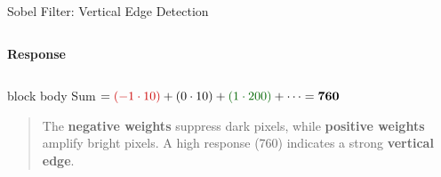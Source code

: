 \documentclass[
11pt,notheorems,hyperref={pdfauthor=whatever}
]{beamer}
\begin{document}
\begin{frame}{Sobel Filter: Vertical Edge Detection}
\begin{columns}[c,onlytextwidth]
    \centering
    \textbf{\footnotesize Response}\\[0.35em]

\end{columns}

\vspace{1em}



\pause
\begin{beamercolorbox}[wd=\linewidth, sep=6pt, center, rounded=true]{block body}
    \small
    Sum $= \textcolor{red!80!black}{(-1 \cdot 10)} + (0 \cdot 10) + \textcolor{textGreen}{(1 \cdot 200)} + \dots = \mathbf{760}$
\end{beamercolorbox}


\pause

\vspace{1.5em}

\begin{quote}\small
The \textbf{\textcolor{red!80!black}{negative weights}} suppress dark pixels, while
\textbf{\textcolor{textGreen}{positive weights}} amplify bright pixels.
A high response (760) indicates a strong \textbf{vertical edge}.
\end{quote}

\end{frame}
\end{document}
